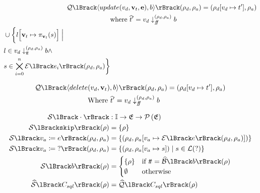 \begin{align}
    \sqlsem{\langle upd&ate(v_d, \mathbf{v}_t, \mathbf{e}), b \rangle} (\rho_d, \rho_a) = (\rho_d[v_d \mapsto t'], \rho_a) \\
    &\text{where }\abstable' = v_d \downarrow_{\false}^{(\rho_d, \rho_a)} b \\
    \begin{split}
        &\cup \biggl\{ l\Bigl[ \mathbf{v}_t \mapsto \pi_{\mathbf{v}_t}(s) \Bigr] \;\Big|\;\\
        &l \in v_d \downarrow_{\true}^{(\rho_d, \rho_a)} b \land \\
        &s \in \bigtimes_{i = 0}^{n} \expsem{e_i}(\rho_d, \rho_a) \biggr\}
    \end{split}
\end{align}

\begin{align}
    \sqlsem{\langle delete&(v_d, \mathbf{v}_t), b \rangle} (\rho_d, \rho_a) = (\rho_d[v_d \mapsto t'], \rho_a) \\
    &\text{Where }\abstable' = v_d \downarrow_{\false}^{(\rho_d, \rho_a)} b
\end{align}

\begin{align}
    \sem{\cdot} &: \instructions \rightarrow \environments \rightarrow \powerset{\environments} \\
    \sem{\texttt{skip}}(\environment) &= \left\{ \environment \right\} \\
    \sem{v_a \coloneqq e}(\environment_d, \environment_a) &= \left\{(\environment_d, \environment_a[v_a \mapsto \expsem{e}(\environment_d, \environment_a)]) \right\} \\
    \sem{v_a \coloneqq \; ?}(\environment_d, \environment_a) &= \left\{(\environment_d, \environment_a[v_a \mapsto s]) \mid s \in \lang(?) \right\} \\
    \sem{b}(\environment) &= \begin{cases}
        \{\environment\} & \text{if } \true = \absboolsem{b}(\environment) \\
        \emptyset & \text{otherwise}
    \end{cases} \\
    \abssem{C_{sql}}(\environment) &= \abssqlsem{C_{sql}}(\environment)
\end{align}
